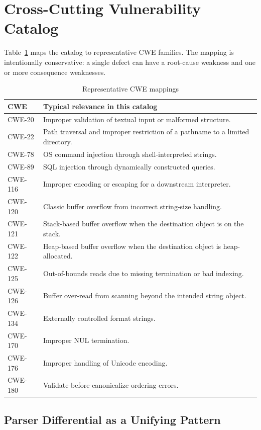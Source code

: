 \documentclass[11pt]{article}
\begin{document}
\section{Cross-Cutting Vulnerability Catalog}

Table~\ref{tab:cwe} maps the catalog to representative CWE families. The mapping is intentionally conservative: a single defect can have a root-cause weakness and one or more consequence weaknesses.

\begin{table}[htbp]
\centering
\small
\caption{Representative CWE mappings}
\label{tab:cwe}
\begin{tabularx}{\textwidth}{>{\ttfamily}l X}
\toprule
CWE & Typical relevance in this catalog \\
\midrule
CWE-20  & Improper validation of textual input or malformed structure. \\
CWE-22  & Path traversal and improper restriction of a pathname to a limited directory. \\
CWE-78  & OS command injection through shell-interpreted strings. \\
CWE-89  & SQL injection through dynamically constructed queries. \\
CWE-116 & Improper encoding or escaping for a downstream interpreter. \\
CWE-120 & Classic buffer overflow from incorrect string-size handling. \\
CWE-121 & Stack-based buffer overflow when the destination object is on the stack. \\
CWE-122 & Heap-based buffer overflow when the destination object is heap-allocated. \\
CWE-125 & Out-of-bounds reads due to missing termination or bad indexing. \\
CWE-126 & Buffer over-read from scanning beyond the intended string object. \\
CWE-134 & Externally controlled format strings. \\
CWE-170 & Improper NUL termination. \\
CWE-176 & Improper handling of Unicode encoding. \\
CWE-180 & Validate-before-canonicalize ordering errors. \\
\bottomrule
\end{tabularx}
\end{table}

\subsection{Parser Differential as a Unifying Pattern}
\end{document}

